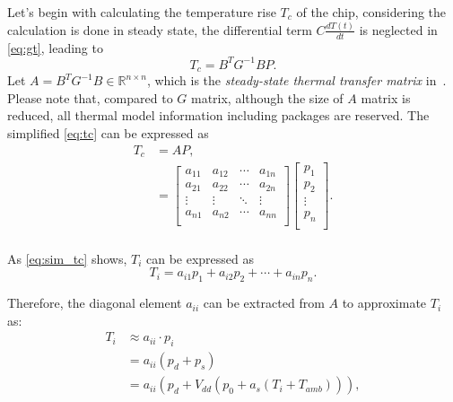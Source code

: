 Let's begin with calculating the temperature rise $T_{c}$ of the chip, considering the calculation is done in steady state, the differential term $C\frac{dT(t)}{dt}$ is neglected in \eqref{eq:gt}, leading to
\begin{equation}\label{eq:tc}
T_{c} = B^{T}G^{-1}BP.
\end{equation}
Let $A = B^{T}G^{-1}B \in \mathbb{R}^{n \times n}$, which is the \emph{steady-state thermal transfer matrix} in~\cite{Reda:SJ'18}. Please note that, compared to $G$ matrix, although the size of $A$ matrix is reduced, all thermal model information including packages are reserved. The simplified 
\eqref{eq:tc} can be expressed as
\begin{equation}\label{eq:sim_tc}
\begin{split}
T_{c} &= AP,\\
&=
{\left[
\begin{matrix}
 a_{11} & a_{12} & \cdots & a_{1n} \\
 a_{21} & a_{22} & \cdots & a_{2n} \\
 \vdots & \vdots & \ddots & \vdots \\
 a_{n1} & a_{n2} & \cdots & a_{nn} \\
\end{matrix}
\right]}
{\left[
\begin{matrix}
 p_{1}   \\
 p_{2}   \\
 \vdots  \\
 p_{n}   \\
\end{matrix}
\right]}.\\
\end{split}
\end{equation}

As \eqref{eq:sim_tc} shows, $T_{i}$ can be expressed as
\begin{equation}\label{eq:ti}
T_{i} =a_{i1}p_{1} + a_{i2}p_{2} +\cdots + a_{in}p_{n}. 
\end{equation}


Therefore, the diagonal element $a_{ii}$ can be extracted from $A$ to approximate $T_{i}$ as:
\begin{equation}\label{eq:t_ap}
\begin{split}
T_{i}&\approx a_{ii} \cdot p_{i}\\
&=a_{ii}(p_{d}+p_{s})\\
&=a_{ii}(p_{d}+V_{dd}(p_{0}+a_{s}(T_{i}+T_{amb}))),
\end{split}
\end{equation}

